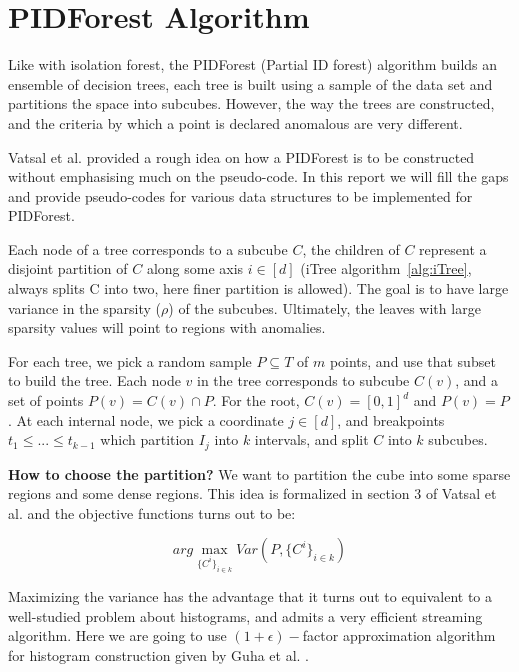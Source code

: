 \section{PIDForest Algorithm}
\label{sec:pidforest-algorithm}

Like with isolation forest, the PIDForest (Partial ID forest) algorithm builds an ensemble of decision trees, each tree is built using a sample of the data set and partitions the space into subcubes.
However, the way the trees are constructed, and the criteria by which a point is declared anomalous are very different.

Vatsal et al. \cite{NIPS2019_9710} provided a rough idea on how a PIDForest is to be constructed without emphasising much on the pseudo-code.
In this report we will fill the gaps and provide pseudo-codes for various data structures to be implemented for PIDForest.

Each node of a tree corresponds to a subcube $C$, the children of $C$ represent a disjoint partition of $C$ along some axis $i \in [d]$ (iTree algorithm~\ref{alg:iTree}, always splits C into two, here finer partition is allowed).
The goal is to have large variance in the sparsity ($\rho$) of the subcubes. 
Ultimately, the leaves with large sparsity values will point to regions with anomalies.

For each tree, we pick a random sample $P \subseteq T$ of $m$ points, and use that subset to build the tree.
Each node $v$ in the tree corresponds to subcube $C(v)$, and a set of points $P(v) = C(v) \cap P$.
For the root, $C(v) = [0, 1]^d$ and $P (v) = P$.
At each internal node, we pick a coordinate $j \in [d]$, and breakpoints $t_{1} \leq ... \leq t_{k-1}$ which partition $I_j$ into $k$ intervals, and split $C$ into $k$ subcubes. 

\textbf{How to choose the partition?} We want to partition the cube into some sparse regions and some dense regions. 
This idea is formalized in section 3 of Vatsal et al. \cite{NIPS2019_9710} and the objective functions turns out to be:

\vspace{-2em}
\begin{equation}
    \label{eq:maximizing-variance}
        arg \max_{ \{ C^i \}_{i \in k} } Var(P, \{ C^i \}_{i \in k})
\end{equation}

Maximizing the variance has the advantage that it turns out to equivalent to a well-studied problem about histograms, and admits a very efficient streaming algorithm.
Here we are going to use $(1+ \epsilon)-$factor approximation algorithm for histogram construction given by Guha et al. \cite{10.1145/1132863.1132873}.

